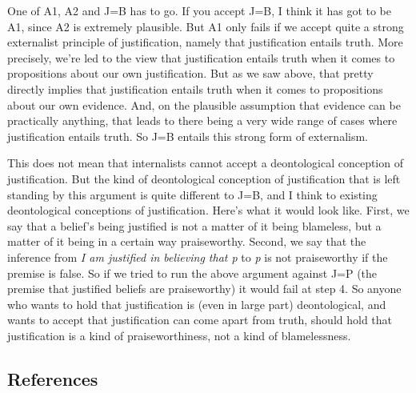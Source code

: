 \documentclass[
  11pt,
  letterpaper,
  DIV=11,
  numbers=noendperiod,
  twoside]{scrartcl}
\begin{document}
One of A1, A2 and J=B has to go. If you accept J=B, I think it has got
to be A1, since A2 is extremely plausible. But A1 only fails if we
accept quite a strong externalist principle of justification, namely
that justification entails truth. More precisely, we're led to the view
that justification entails truth when it comes to propositions about our
own justification. But as we saw above, that pretty directly implies
that justification entails truth when it comes to propositions about our
own evidence. And, on the plausible assumption that evidence can be
practically anything, that leads to there being a very wide range of
cases where justification entails truth. So J=B entails this strong form
of externalism.

This does not mean that internalists cannot accept a deontological
conception of justification. But the kind of deontological conception of
justification that is left standing by this argument is quite different
to J=B, and I think to existing deontological conceptions of
justification. Here's what it would look like. First, we say that a
belief's being justified is not a matter of it being blameless, but a
matter of it being in a certain way praiseworthy. Second, we say that
the inference from \emph{I am justified in believing that p} to \emph{p}
is not praiseworthy if the premise is false. So if we tried to run the
above argument against J=P (the premise that justified beliefs are
praiseworthy) it would fail at step 4. So anyone who wants to hold that
justification is (even in large part) deontological, and wants to accept
that justification can come apart from truth, should hold that
justification is a kind of praiseworthiness, not a kind of
blamelessness.

\subsection*{References}\label{references}
\end{document}
